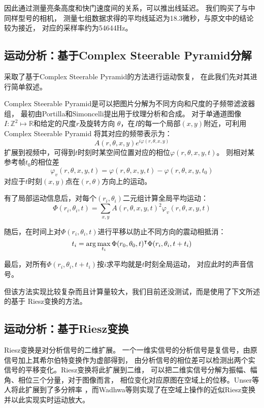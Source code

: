 因此通过测量亮条高度和快门速度间的关系，可以推出线延迟。
我们购买了与\cite{Davis2014VisualMic}中同样型号的相机，
测量七组数据求得的平均线延迟为18.3微秒，与原文中的结论较为接近，
对应的采样率约为54644Hz。

\subsection{运动分析：基于Complex Steerable Pyramid分解}
\cite{Davis2014VisualMic}采取了基于Complex Steerable Pyramid的方法进行运动恢复，
在此我们先对其进行简单叙述。

Complex Steerable Pyramid是可以把图片分解为不同方向和尺度的子频带滤波器组，
最初由Portilla和Simoncelli提出用于纹理分析和合成\cite{Portilla99}。
对于单通道图像$I: \mathbb{Z}^2 \mapsto \mathbb{R}$和给定的尺度$r$及旋转方向
$\theta$，在$I$的每一个局部$(x, y)$附近，可利用Complex Steerable Pyramid
将其对应的频带表示为：
\begin{equation}
    A(r, \theta, x, y) e^{i\varphi(r, \theta, x, y)}
\end{equation}
扩展到视频中，可得到$t$时刻时某空间位置对应的相位$\varphi(r, \theta, x, y, t)$。
则相对某参考帧$t_0$的相位差
\begin{equation}
    \varphi_v(r, \theta, x, y, t) = \varphi(r, \theta, x, y, t) - 
    \varphi(r, \theta, x, y, t_0)
\end{equation}
对应于$t$时刻$(x, y)$点在$(r, \theta)$方向上的运动。

有了局部运动信息后，对每个$(r_i, \theta_i)$二元组计算全局平均运动：
\begin{equation}
    \Phi(r_i, \theta_i, t) = \sum_{x, y}
    A(r, \theta, x, y, t)^2 \varphi_v(r, \theta, x, y, t)
\end{equation}

随后，在时间上对$\Phi(r_i, \theta_i, t)$进行平移以防止不同方向的震动相抵消：
\begin{equation}
    t_i = \arg\max_{t_i} \Phi(r_0, \theta_0, t)^\intercal\Phi(r_i, \theta_i, t +
    t_i)
\end{equation}

最后，对所有$\Phi(r_i, \theta_i, t + t_i)$按$i$求平均就是$t$时刻全局运动，
对应此时的声音信号。

但该方法实现比较复杂而且计算量较大，我们目前还没测试，而是使用了下文所述的基于
Riesz变换的方法。


\subsection{运动分析：基于Riesz变换}
Riesz变换\cite{felsberg2001monogenic}是对分析信号的二维扩展。
一个一维实信号的分析信号是复信号，由原信号加上其希尔伯特变换作为虚部得到，
由分析信号的相位差可以检测出两个实信号的平移变化。Riesz变换将此扩展到二维，
可以把二维实信号分解为振幅、幅角、相位三个分量，对于图像而言，
相位变化对应原图在空域上的位移。Unser等人将此扩展到了多分辨率
\cite{unser2009multiresolution}，而Wadhwa等则实现了在空域上操作的近似Riesz变换
并以此实现实时运动放大\cite{Wadhwa2014RieszPyramid}。

